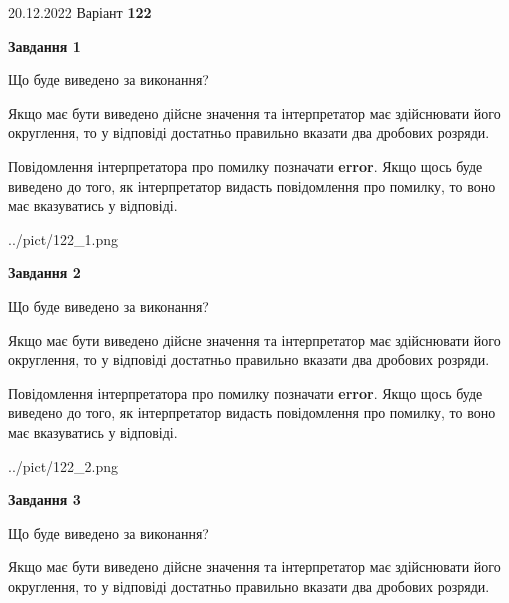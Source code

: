 \documentclass[12pt, ukrainian]{article}
\begin{document}
{20.12.2022 Варіант \No \textbf { 122 }\par}
{
\begin {Large}

{\begin {center}\textbf{Завдання 1}\end {center}}\par
Що буде виведено за виконання? \par

Якщо має бути виведено дійсне значення та інтерпретатор має здійснювати його округлення, 
то у відповіді достатньо правильно вказати два дробових розряди.

Повідомлення інтерпретатора про помилку позначати \textbf{error}.
Якщо щось буде виведено до того, як інтерпретатор видасть повідомлення про помилку, 
то воно має вказуватись у відповіді. \par

\begin{center}
	{../pict/122_1.png}
\end{center}
\newpage

{\begin {center}\textbf{Завдання 2}\end {center}}\par
Що буде виведено за виконання? \par

Якщо має бути виведено дійсне значення та інтерпретатор має здійснювати його округлення, 
то у відповіді достатньо правильно вказати два дробових розряди.

Повідомлення інтерпретатора про помилку позначати \textbf{error}.
Якщо щось буде виведено до того, як інтерпретатор видасть повідомлення про помилку, 
то воно має вказуватись у відповіді. \par

\begin{center}
	{../pict/122_2.png}
\end{center}
\newpage

{\begin {center}\textbf{Завдання 3}\end {center}}\par
Що буде виведено за виконання? \par

Якщо має бути виведено дійсне значення та інтерпретатор має здійснювати його округлення, 
то у відповіді достатньо правильно вказати два дробових розряди.


\end{Large}}
\end{document}
